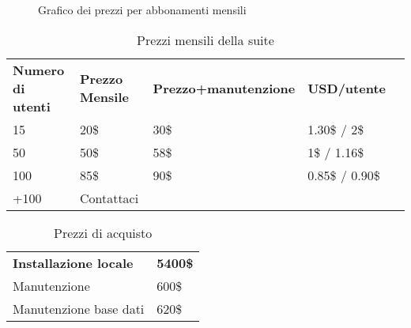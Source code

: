 \documentclass[../../documentazione.tex]{subfiles}
\begin{document}
    \begin{figure}
        \caption{Grafico dei prezzi per abbonamenti mensili}
    \end{figure}

    \begin{table}[H]
        \caption{Prezzi mensili della suite}
        \begin{tabular}{l|llll}
            \textbf{Numero di utenti} & \textbf{Prezzo Mensile} & \textbf{Prezzo+manutenzione} & \textbf{USD/utente} &  \\ \cline{1-4}
            15 & 20\$            & 30\$                         & 1.30\$ / 2\$          &  \\
            50 & 50\$            & 58\$                         & 1\$ / 1.16\$          &  \\
            100 & 85\$            & 90\$                         & 0.85\$ / 0.90\$       &  \\
            +100 & Contattaci & & &
        \end{tabular}
    \end{table}

    \begin{table}[H]
        \caption{Prezzi di acquisto}
        \begin{tabular}{ll}
            \textbf{Installazione locale} & \textbf{5400\$}\\
            Manutenzione & 600\$          \\
            Manutenzione base dati & 620\$          \\
        \end{tabular}
    \end{table}
\end{document}
